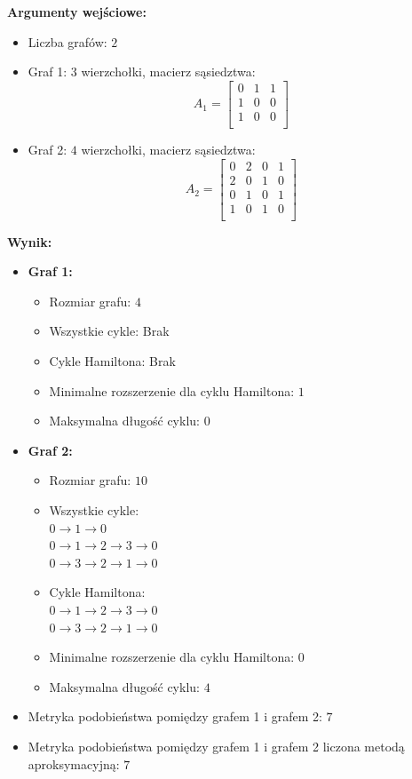 \noindent \textbf{Argumenty wejściowe:}
\begin{itemize}
    \item Liczba grafów: \(2\)
    \item Graf 1: \(3\) wierzchołki, macierz sąsiedztwa:
    \[
    A_1 = \begin{bmatrix}
    0 & 1 & 1 \\
    1 & 0 & 0 \\
    1 & 0 & 0 \\
    \end{bmatrix}
    \]
    \item Graf 2: \(4\) wierzchołki, macierz sąsiedztwa:
    \[
    A_2 = \begin{bmatrix}
    0 & 2 & 0 & 1 \\
    2 & 0 & 1 & 0 \\
    0 & 1 & 0 & 1 \\
    1 & 0 & 1 & 0 \\
    \end{bmatrix}
    \]
\end{itemize}

\noindent \textbf{Wynik:}
\begin{itemize}
    \item \textbf{Graf 1:}
    \begin{itemize}
        \item Rozmiar grafu: \(4\)
        \item Wszystkie cykle: Brak
        \item Cykle Hamiltona: Brak
        \item Minimalne rozszerzenie dla cyklu Hamiltona: \(1\)
        \item Maksymalna długość cyklu: \(0\)
    \end{itemize}
    \item \textbf{Graf 2:}
    \begin{itemize}
        \item Rozmiar grafu: \(10\)
        \item Wszystkie cykle:
        		\\ \(0 \to 1 \to 0\)
    			\\ \(0 \to 1 \to 2 \to 3 \to 0\)
        		\\ \(0 \to 3 \to 2 \to 1 \to 0\)
        \item Cykle Hamiltona:
            	\\ \(0 \to 1 \to 2 \to 3 \to 0\)
        		\\ \(0 \to 3 \to 2 \to 1 \to 0\)
        \item Minimalne rozszerzenie dla cyklu Hamiltona: \(0\)
        \item Maksymalna długość cyklu: \(4\)
    \end{itemize}
    \item Metryka podobieństwa pomiędzy grafem 1 i grafem 2: \(7\)
    \item Metryka podobieństwa pomiędzy grafem 1 i grafem 2 liczona metodą aproksymacyjną: \(7\)
\end{itemize}

